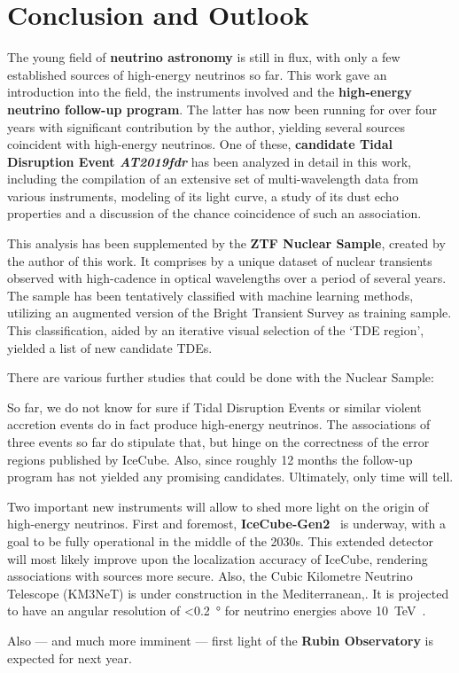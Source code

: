 \chapter*{Conclusion and Outlook}\label{conclusion}
The young field of \textbf{neutrino astronomy} is still in flux, with only a few established sources of high-energy neutrinos so far. This work gave an introduction into the field, the instruments involved and the \textbf{high-energy neutrino follow-up program}. The latter has now been running for over four years with significant contribution by the author, yielding several sources coincident with high-energy neutrinos. One of these, \textbf{candidate Tidal Disruption Event \textit{AT2019fdr}} has been analyzed in detail in this work, including the compilation of an extensive set of multi-wavelength data from various instruments, modeling of its light curve, a study of its dust echo properties and a discussion of the chance coincidence of such an association.

This analysis has been supplemented by the \textbf{ZTF Nuclear Sample}, created by the author of this work. It comprises by a unique dataset of nuclear transients observed with high-cadence in optical wavelengths over a period of several years. The sample has been tentatively classified with machine learning methods, utilizing an augmented version of the Bright Transient Survey as training sample. This classification, aided by an iterative visual selection of the `TDE region', yielded a list of new candidate TDEs.

There are various further studies that could be done with the Nuclear Sample:

So far, we do not know for sure if Tidal Disruption Events or similar violent accretion events do in fact produce high-energy neutrinos. The associations of three events so far do stipulate that, but hinge on the correctness of the error regions published by IceCube. Also, since roughly 12 months the follow-up program has not yielded any promising candidates. Ultimately, only time will tell.

Two important new instruments will allow to shed more light on the origin of high-energy neutrinos. First and foremost, \textbf{IceCube-Gen2}~ is underway, with a goal to be fully operational in the middle of the 2030s. This extended detector will most likely improve upon the localization accuracy of IceCube, rendering associations with sources more secure. Also, the Cubic Kilometre Neutrino Telescope (KM3NeT) is under construction in the Mediterranean,. It is projected to have an angular resolution of \SI{<0.2}{\degree} for neutrino energies above \SI{10}{\tera\eV}~.

Also --- and much more imminent --- first light of the \textbf{Rubin Observatory} is expected for next year.
